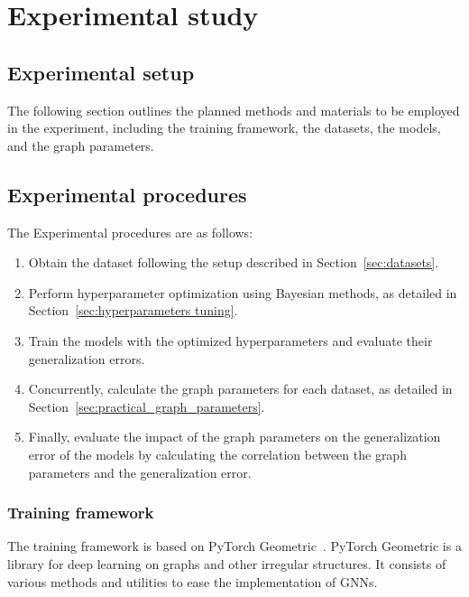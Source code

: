 \chapter{Experimental study}\label{chap:experiments}
\section{Experimental setup}
The following section outlines the planned methods and materials to be employed in the experiment, including the training framework, the datasets, the models, and the graph parameters.

\section{Experimental procedures}\label{sec:Experimental procedures}
The Experimental procedures are as follows:

\begin{enumerate}
    \item Obtain the dataset following the setup described in Section~\ref{sec:datasets}.
    \item Perform hyperparameter optimization using Bayesian methods, as detailed in Section~\ref{sec:hyperparameters tuning}.
    \item Train the models with the optimized hyperparameters and evaluate their generalization errors.
    \item Concurrently, calculate the graph parameters for each dataset, as detailed in Section~\ref{sec:practical_graph_parameters}.
    \item Finally, evaluate the impact of the graph parameters on the generalization error of the models by calculating the correlation between the graph parameters and the generalization error.
\end{enumerate}


\subsection{Training framework}
The training framework is based on PyTorch Geometric~\cite{fey2019fast}. PyTorch Geometric is a library for deep learning on graphs and other irregular structures. It consists of various methods and utilities to ease the implementation of GNNs. 

